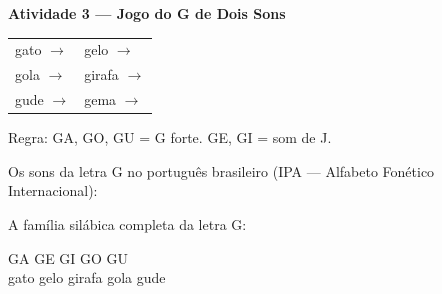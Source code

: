 \begin{consolidacao}
\textbf{Atividade 3 --- Jogo do G de Dois Sons}


\begin{center}
\begin{tabular}{ll}
gato \quad $\rightarrow$ \underline{\hspace{2cm}} & gelo \quad $\rightarrow$ \underline{\hspace{2cm}} \\
gola \quad $\rightarrow$ \underline{\hspace{2cm}} & girafa \quad $\rightarrow$ \underline{\hspace{2cm}} \\
gude \quad $\rightarrow$ \underline{\hspace{2cm}} & gema \quad $\rightarrow$ \underline{\hspace{2cm}}
\end{tabular}
\end{center}
Regra: GA, GO, GU = G forte. GE, GI = som de J.

\end{consolidacao}


\begin{sonsdaletra}
Os sons da letra G no portugu\^es{} brasileiro (IPA --- Alfabeto Fon\'etico Internacional):

\end{sonsdaletra}


\begin{familiasilabica}
A fam\'ilia sil\'abica completa da letra G:

\begin{center}
GA \quad GE \quad GI \quad GO \quad GU \\[0.5em] gato \quad gelo \quad girafa \quad gola \quad gude
\end{center}
\end{familiasilabica}


